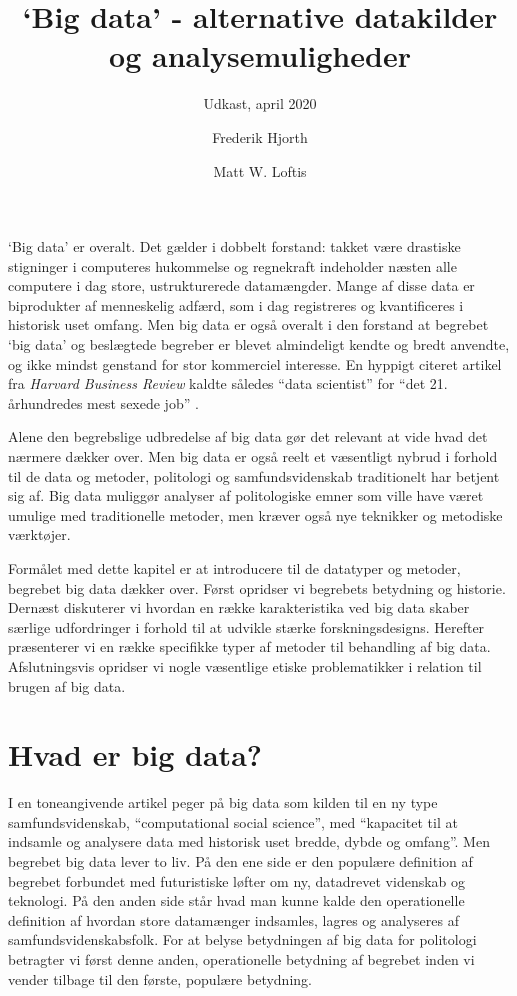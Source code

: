 \documentclass[12pt,]{article}
\title{`Big data' - alternative datakilder og analysemuligheder}
\subtitle{Udkast, april 2020}
\author{Frederik Hjorth \and Matt W. Loftis}
\date{}
\begin{document}
\maketitle

`Big data' er overalt. Det gælder i dobbelt forstand: takket være
drastiske stigninger i computeres hukommelse og regnekraft indeholder
næsten alle computere i dag store, ustrukturerede datamængder. Mange af
disse data er biprodukter af menneskelig adfærd, som i dag registreres
og kvantificeres i historisk uset omfang. Men big data er også overalt i
den forstand at begrebet `big data' og beslægtede begreber er blevet
almindeligt kendte og bredt anvendte, og ikke mindst genstand for stor
kommerciel interesse. En hyppigt citeret artikel fra \emph{Harvard
Business Review} kaldte således ``data scientist'' for ``det 21.
århundredes mest sexede job'' \citep{davenport2012data}.

Alene den begrebslige udbredelse af big data gør det relevant at vide
hvad det nærmere dækker over. Men big data er også reelt et væsentligt
nybrud i forhold til de data og metoder, politologi og samfundsvidenskab
traditionelt har betjent sig af. Big data muliggør analyser af
politologiske emner som ville have været umulige med traditionelle
metoder, men kræver også nye teknikker og metodiske værktøjer.

Formålet med dette kapitel er at introducere til de datatyper og
metoder, begrebet big data dækker over. Først opridser vi begrebets
betydning og historie. Dernæst diskuterer vi hvordan en række
karakteristika ved big data skaber særlige udfordringer i forhold til at
udvikle stærke forskningsdesigns. Herefter præsenterer vi en række
specifikke typer af metoder til behandling af big data. Afslutningsvis
opridser vi nogle væsentlige etiske problematikker i relation til brugen
af big data.

\hypertarget{hvad-er-big-data}{%
\section{Hvad er big data?}\label{hvad-er-big-data}}

I en toneangivende artikel peger \citet{lazeretal} på big data som
kilden til en ny type samfundsvidenskab, ``computational social
science'', med ``kapacitet til at indsamle og analysere data med
historisk uset bredde, dybde og omfang''. Men begrebet big data lever to
liv. På den ene side er den populære definition af begrebet forbundet
med futuristiske løfter om ny, datadrevet videnskab og teknologi. På den
anden side står hvad man kunne kalde den operationelle definition af
hvordan store datamænger indsamles, lagres og analyseres af
samfundsvidenskabsfolk. For at belyse betydningen af big data for
politologi betragter vi først denne anden, operationelle betydning af
begrebet inden vi vender tilbage til den første, populære betydning.
\end{document}
